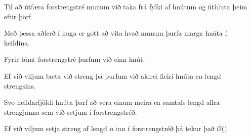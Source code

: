 {
	{
		\item<1-> Til að útfæra forstrengstré munum við taka frá fylki af hnútum og úthluta þeim eftir þörf.
		\item<2-> Með þessa aðferð í huga er gott að vita hvað munum þurfa marga hnúta í heildina.
		\item<3-> Fyrir tómt forstrengstré þurfum við einn hnút.
		\item<4-> Ef við viljum bæta við streng þá þurfum við aldrei fleiri hnúta en lengd strengsins.
		\item<5-> Svo heildarfjöldi hnúta þarf að vera einum meira en samtals lengd allra strengjanna sem við setjum í forstrengstréð.
	}
}

{
}

{
	{
		\item<1-> Ef við viljum setja streng af lengd $n$ inn í forstrengstréð þá tekur það $\mathcal{O}($\onslide<2->{$\,n\,$}$)$.
	}
}

{
}


